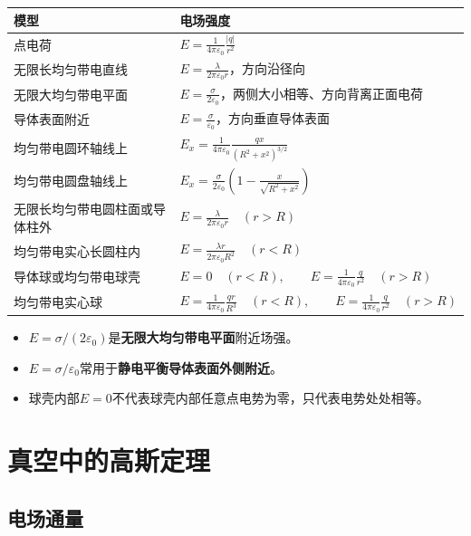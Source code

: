 \documentclass[UTF8,zihao=-4]{ctexart}
\newcommand{\epsz}{\varepsilon_0}
\begin{document}
\begin{longtable}{>{\raggedright\arraybackslash}p{}>{\raggedright\arraybackslash}p{}}
\toprule
\textbf{模型} & \textbf{电场强度} \\
\midrule
点电荷 & \(\displaystyle E=\frac{1}{4\pi\epsz}\frac{|q|}{r^2}\) \\
无限长均匀带电直线 & \(\displaystyle E=\frac{\lambda}{2\pi\epsz r}\)，方向沿径向 \\
无限大均匀带电平面 & \(\displaystyle E=\frac{\sigma}{2\epsz}\)，两侧大小相等、方向背离正面电荷 \\
导体表面附近 & \(\displaystyle E=\frac{\sigma}{\epsz}\)，方向垂直导体表面 \\
均匀带电圆环轴线上 & \(\displaystyle E_x=\frac{1}{4\pi\epsz}\frac{q x}{(R^2+x^2)^{3/2}}\) \\
均匀带电圆盘轴线上 & \(\displaystyle E_x=\frac{\sigma}{2\epsz}\left(1-\frac{x}{\sqrt{R^2+x^2}}\right)\) \\
无限长均匀带电圆柱面或导体柱外 & \(\displaystyle E=\frac{\lambda}{2\pi\epsz r}\quad(r>R)\) \\
均匀带电实心长圆柱内 & \(\displaystyle E=\frac{\lambda r}{2\pi\epsz R^2}\quad(r<R)\) \\
导体球或均匀带电球壳 & \(\displaystyle E=0\quad(r<R),\qquad E=\frac{1}{4\pi\epsz}\frac{q}{r^2}\quad(r>R)\) \\
均匀带电实心球 & \(\displaystyle E=\frac{1}{4\pi\epsz}\frac{qr}{R^3}\quad(r<R),\qquad E=\frac{1}{4\pi\epsz}\frac{q}{r^2}\quad(r>R)\) \\
\bottomrule
\end{longtable}

\begin{warnbox}[结论公式必须看适用条件]
\begin{itemize}
  \item \(E=\sigma/(2\epsz)\)是\textbf{无限大均匀带电平面}附近场强。
  \item \(E=\sigma/\epsz\)常用于\textbf{静电平衡导体表面外侧附近}。
  \item 球壳内部\(E=0\)不代表球壳内部任意点电势为零，只代表电势处处相等。
\end{itemize}
\end{warnbox}

\section{真空中的高斯定理}

\subsection{电场通量}
\end{document}
